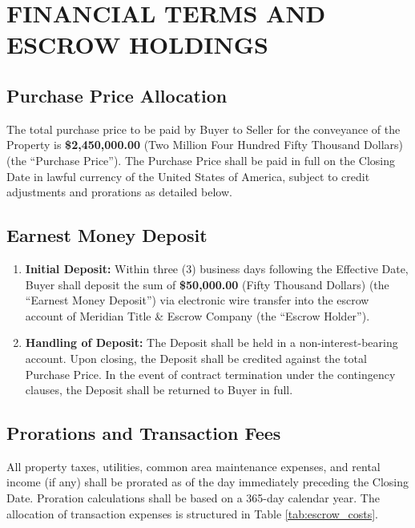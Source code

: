 \section{FINANCIAL TERMS AND ESCROW HOLDINGS}

\subsection{Purchase Price Allocation}
The total purchase price to be paid by Buyer to Seller for the conveyance of the Property is \textbf{\$2,450,000.00} (Two Million Four Hundred Fifty Thousand Dollars) (the ``Purchase Price''). The Purchase Price shall be paid in full on the Closing Date in lawful currency of the United States of America, subject to credit adjustments and prorations as detailed below.

\subsection{Earnest Money Deposit}
\begin{enumerate}
    \item \textbf{Initial Deposit:} Within three (3) business days following the Effective Date, Buyer shall deposit the sum of \textbf{\$50,000.00} (Fifty Thousand Dollars) (the ``Earnest Money Deposit'') via electronic wire transfer into the escrow account of Meridian Title \& Escrow Company (the ``Escrow Holder'').
    \item \textbf{Handling of Deposit:} The Deposit shall be held in a non-interest-bearing account. Upon closing, the Deposit shall be credited against the total Purchase Price. In the event of contract termination under the contingency clauses, the Deposit shall be returned to Buyer in full.
\end{enumerate}

\subsection{Prorations and Transaction Fees}
All property taxes, utilities, common area maintenance expenses, and rental income (if any) shall be prorated as of the day immediately preceding the Closing Date. Proration calculations shall be based on a 365-day calendar year. The allocation of transaction expenses is structured in Table \ref{tab:escrow_costs}.

